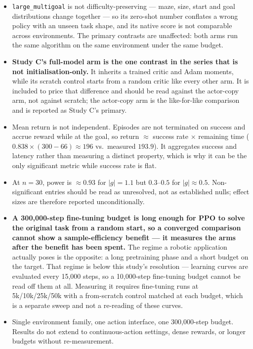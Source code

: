 \begin{itemize}
  \item \texttt{large\_multigoal} is not difficulty-preserving --- maze, size, start and goal distributions change together --- so its zero-shot number conflates a wrong policy with an unseen task shape, and its native score is not comparable across environments. The primary contrasts are unaffected: both arms run the same algorithm on the same environment under the same budget.
  \item \textbf{Study C's full-model arm is the one contrast in the series that is not initialisation-only.} It inherits a trained critic and Adam moments, while its scratch control starts from a random critic like every other arm. It is included to price that difference and should be read against the actor-copy arm, not against scratch; the actor-copy arm is the like-for-like comparison and is reported as Study C's primary.
  \item Mean return is not independent. Episodes are not terminated on success and accrue reward while at the goal, so return $\approx$ success rate $\times$ remaining time ($0.838\times(300-66)\approx196$ vs.\ measured $193.9$). It aggregates success and latency rather than measuring a distinct property, which is why it can be the only significant metric while success rate is flat.
  \item At $n=30$, power is $\approx0.93$ for $|g|=1.1$ but $0.3$--$0.5$ for $|g|\approx0.5$. Non-significant entries should be read as unresolved, not as established nulls; effect sizes are therefore reported unconditionally.
  \item \textbf{A 300,000-step fine-tuning budget is long enough for PPO to solve the original task from a random start, so a converged comparison cannot show a sample-efficiency benefit --- it measures the arms after the benefit has been spent.} The regime a robotic application actually poses is the opposite: a long pretraining phase and a short budget on the target. That regime is below this study's resolution --- learning curves are evaluated every 15,000 steps, so a 10,000-step fine-tuning budget cannot be read off them at all. Measuring it requires fine-tuning runs at 5k/10k/25k/50k with a from-scratch control matched at each budget, which is a separate sweep and not a re-reading of these curves.
  \item Single environment family, one action interface, one 300,000-step budget. Results do not extend to continuous-action settings, dense rewards, or longer budgets without re-measurement.
\end{itemize}
